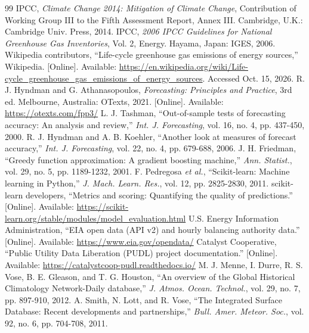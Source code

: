 \documentclass[10pt,journal,compsoc]{IEEEtran}
\begin{document}
\begin{thebibliography}{99}
 IPCC, \emph{Climate Change 2014: Mitigation of Climate Change}, Contribution of Working Group III to the Fifth Assessment Report, Annex III. Cambridge, U.K.: Cambridge Univ. Press, 2014.
 IPCC, \emph{2006 IPCC Guidelines for National Greenhouse Gas Inventories}, Vol. 2, Energy. Hayama, Japan: IGES, 2006.
 Wikipedia contributors, ``Life-cycle greenhouse gas emissions of energy sources,'' Wikipedia. [Online]. Available: \url{https://en.wikipedia.org/wiki/Life-cycle_greenhouse_gas_emissions_of_energy_sources}. Accessed Oct. 15, 2026.
 R. J. Hyndman and G. Athanasopoulos, \emph{Forecasting: Principles and Practice}, 3rd ed. Melbourne, Australia: OTexts, 2021. [Online]. Available: \url{https://otexts.com/fpp3/}
 L. J. Tashman, ``Out-of-sample tests of forecasting accuracy: An analysis and review,'' \emph{Int. J. Forecasting}, vol. 16, no. 4, pp. 437-450, 2000.
 R. J. Hyndman and A. B. Koehler, ``Another look at measures of forecast accuracy,'' \emph{Int. J. Forecasting}, vol. 22, no. 4, pp. 679-688, 2006.
 J. H. Friedman, ``Greedy function approximation: A gradient boosting machine,'' \emph{Ann. Statist.}, vol. 29, no. 5, pp. 1189-1232, 2001.
 F. Pedregosa \emph{et al.}, ``Scikit-learn: Machine learning in Python,'' \emph{J. Mach. Learn. Res.}, vol. 12, pp. 2825-2830, 2011.
 scikit-learn developers, ``Metrics and scoring: Quantifying the quality of predictions.'' [Online]. Available: \url{https://scikit-learn.org/stable/modules/model_evaluation.html}
 U.S. Energy Information Administration, ``EIA open data (API v2) and hourly balancing authority data.'' [Online]. Available: \url{https://www.eia.gov/opendata/}
 Catalyst Cooperative, ``Public Utility Data Liberation (PUDL) project documentation.'' [Online]. Available: \url{https://catalystcoop-pudl.readthedocs.io/}
 M. J. Menne, I. Durre, R. S. Vose, B. E. Gleason, and T. G. Houston, ``An overview of the Global Historical Climatology Network-Daily database,'' \emph{J. Atmos. Ocean. Technol.}, vol. 29, no. 7, pp. 897-910, 2012.
 A. Smith, N. Lott, and R. Vose, ``The Integrated Surface Database: Recent developments and partnerships,'' \emph{Bull. Amer. Meteor. Soc.}, vol. 92, no. 6, pp. 704-708, 2011.

\end{thebibliography}
\end{document}

